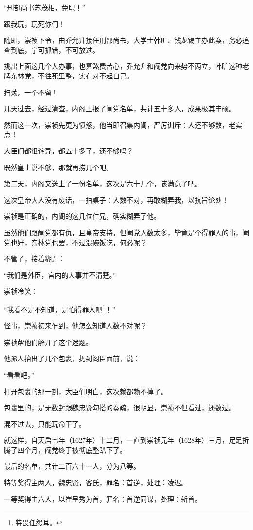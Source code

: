 \begin{multicols}{\theparacolNo}
		“刑部尚书苏茂相，免职！”

		跟我玩，玩死你们！

		随即，崇祯下令，由乔允升接任刑部尚书，大学士韩旷、钱龙锡主办此案，务必追查到底，宁可抓错，不可放过。

		挑出上面这几个人办事，也算煞费苦心，乔允升和阉党向来势不两立，韩旷这种老牌东林党，不往死里整，实在对不起自己。

		扫荡，一个不留！

		几天过去，经过清查，内阁上报了阉党名单，共计五十多人，成果极其丰硕。

		然而这一次，崇祯先更为愤怒，他当即召集内阁，严厉训斥：人还不够数，老实点！

		大臣们都很诧异，都五十多了，还不够吗？

		既然皇上说不够，那就再捞几个吧。

		第二天，内阁又送上了一份名单，这次是六十几个，该满意了吧。

		这次皇帝大人没有废话，一拍桌子：人数不对，再敢糊弄我，以抗旨论处！

		崇祯是正确的，内阁的这几位仁兄，确实糊弄了他。

		虽然他们跟阉党都有仇，且皇帝支持，但阉党人数太多，毕竟是个得罪人的事，阉党也好，东林党也罢，不过混碗饭吃，何必呢？

		不管了，接着糊弄：

		“我们是外臣，宫内的人事并不清楚。”

		崇祯冷笑：

		“我看不是不知道，是怕得罪人吧\footnote{特畏任怨耳。}！”

		怪事，崇祯初来乍到，他怎么知道人数不对呢？

		崇祯帮他们解开了这个迷题。

		他派人抬出了几个包裹，扔到阁臣面前，说：

		“看看吧。”

		打开包裹的那一刻，大臣们明白，这次赖都赖不掉了。

		包裹里的，是无数封跟魏忠贤勾搭的奏疏，很明显，崇祯不但看过，还数过。

		混不过去，只能玩命干了。

		就这样，自天启七年（1627年）十二月，一直到崇祯元年（1628年）三月，足足折腾了四个月，阉党终于被彻底整趴下了。

		最后的名单，共计二百六十一人，分为八等。

		特等奖得主两人，魏忠贤，客氏，罪名：首逆，处理：凌迟。

		一等奖得主六人，以崔呈秀为首，罪名：首逆同谋，处理：斩首。


\end{multicols}
